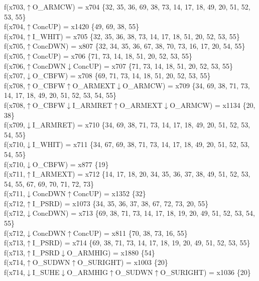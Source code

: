 f(x703,$\uparrow$O\_ARMCW) = x704 \{32, 35, 36, 69, 38, 73, 14, 17, 18, 49, 20, 51, 52, 53, 55\} \\  
f(x704,$\uparrow$ConcUP) = x1420 \{49, 69, 38, 55\} \\  
f(x704,$\uparrow$I\_WHIT) = x705 \{32, 35, 36, 38, 73, 14, 17, 18, 51, 20, 52, 53, 55\} \\  
f(x705,$\uparrow$ConcDWN) = x807 \{32, 34, 35, 36, 67, 38, 70, 73, 16, 17, 20, 54, 55\} \\  
f(x705,$\uparrow$ConcUP) = x706 \{71, 73, 14, 18, 51, 20, 52, 53, 55\} \\  
f(x706,$\uparrow$ConcDWN$\downarrow$ConcUP) = x707 \{71, 73, 14, 18, 51, 20, 52, 53, 55\} \\  
f(x707,$\downarrow$O\_CBFW) = x708 \{69, 71, 73, 14, 18, 51, 20, 52, 53, 55\} \\  
f(x708,$\uparrow$O\_CBFW$\uparrow$O\_ARMEXT$\downarrow$O\_ARMCW) = x709 \{34, 69, 38, 71, 73, 14, 17, 18, 49, 20, 51, 52, 53, 54, 55\} \\  
f(x708,$\uparrow$O\_CBFW$\downarrow$I\_ARMRET$\uparrow$O\_ARMEXT$\downarrow$O\_ARMCW) = x1134 \{20, 38\} \\  
f(x709,$\downarrow$I\_ARMRET) = x710 \{34, 69, 38, 71, 73, 14, 17, 18, 49, 20, 51, 52, 53, 54, 55\} \\  
f(x710,$\downarrow$I\_WHIT) = x711 \{34, 67, 69, 38, 71, 73, 14, 17, 18, 49, 20, 51, 52, 53, 54, 55\} \\  
f(x710,$\downarrow$O\_CBFW) = x877 \{19\} \\  
f(x711,$\uparrow$I\_ARMEXT) = x712 \{14, 17, 18, 20, 34, 35, 36, 37, 38, 49, 51, 52, 53, 54, 55, 67, 69, 70, 71, 72, 73\} \\  
f(x711,$\downarrow$ConcDWN$\uparrow$ConcUP) = x1352 \{32\} \\  
f(x712,$\uparrow$I\_PSRD) = x1073 \{34, 35, 36, 37, 38, 67, 72, 73, 20, 55\} \\  
f(x712,$\downarrow$ConcDWN) = x713 \{69, 38, 71, 73, 14, 17, 18, 19, 20, 49, 51, 52, 53, 54, 55\} \\  
f(x712,$\downarrow$ConcDWN$\uparrow$ConcUP) = x811 \{70, 38, 73, 16, 55\} \\  
f(x713,$\uparrow$I\_PSRD) = x714 \{69, 38, 71, 73, 14, 17, 18, 19, 20, 49, 51, 52, 53, 55\} \\  
f(x713,$\uparrow$I\_PSRD$\downarrow$O\_ARMHIG) = x1880 \{54\} \\  
f(x714,$\uparrow$O\_SUDWN$\uparrow$O\_SURIGHT) = x1003 \{20\} \\  
f(x714,$\downarrow$I\_SUHE$\downarrow$O\_ARMHIG$\uparrow$O\_SUDWN$\uparrow$O\_SURIGHT) = x1036 \{20\} \\  
